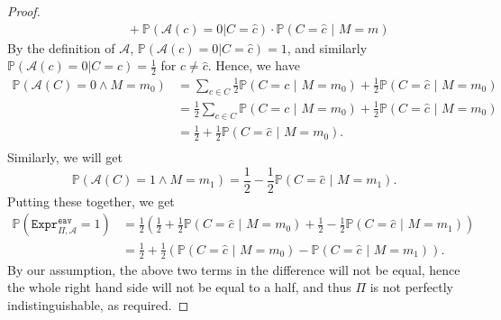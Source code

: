 \documentclass{article}
\theoremstyle{definition}
\theoremstyle{example}
\newcommand{\A}{\mathcal{A}}
\newcommand{\Prob}{\mathbb{P}}
\newcommand{\Expr}[2]{\texttt{Expr}^{\texttt{#1}}_{#2}}
\begin{document}
\begin{proof}
\begin{align*}
                                   &\quad\quad\quad + \Prob(\A(c) = 0 | C = \hat{c}) \cdot \Prob(C = \hat{c}\,\,|\,\, M = m)
  \end{align*}
  By the definition of $\A$, $ \Prob(\A(c) = 0 | C = \hat{c}) = 1$, and
  similarly $ \Prob(\A(c) = 0 | C = c) = \frac12$ for $c \neq \hat{c}$. Hence,
  we have
  \begin{align*}
    \Prob(\A(C) = 0 \land M = m_0) &= \sum_{c\in C} \frac12 \Prob(C = c\,\,|\,\, M = m_0) + \frac12\Prob(C = \hat{c} \,\, |\,\, M = m_0) \\
                                   &=\frac12 \sum_{c\in C} \Prob(C = c \,\,|\,\, M = m_0) + \frac12\Prob(C = \hat{c} \,\,|\,\, M = m_0) \\
                                   &= \frac12 + \frac12\Prob(C = \hat{c} \,\,|\,\, M = m_0). \\
  \end{align*}
  Similarly, we will get
  \[
    \Prob(\A(C) = 1 \land M = m_1) = \frac12 - \frac12\Prob(C = \hat{c} \,\,|\,\, M = m_1). 
  \]
  Putting these together, we get
  \begin{align*}
    \Prob(\Expr{eav}{\Pi, \A} = 1) & = \frac12 \left( \frac12 + \frac12\Prob(C = \hat{c} \,\,|\,\, M = m_0) + \frac12 - \frac12\Prob(C = \hat{c} \,\,|\,\, M = m_1) \right) \\
                                   &= \frac12 + \frac12 (\Prob(C = \hat{c} \,\,|\,\, M = m_0) - \Prob(C = \hat{c} \,\,|\,\, M = m_1)).
  \end{align*}
  By our assumption, the above two terms in the difference will not be equal,
  hence the whole right hand side will not be equal to a half, and thus $\Pi$ is
  not perfectly indistinguishable, as required.
\end{proof}
\end{document}
